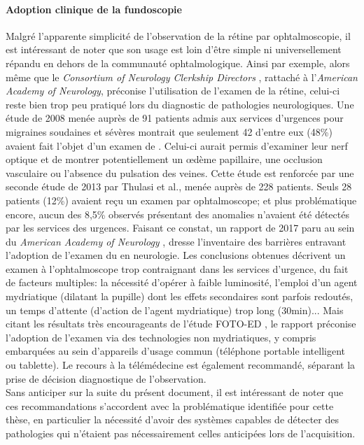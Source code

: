\paragraph{Adoption clinique de la fundoscopie}
Malgré l'apparente simplicité de l'observation de la rétine par ophtalmoscopie, il est intéressant de noter que son usage est loin d'être simple ni universellement répandu en dehors de la communauté ophtalmologique. Ainsi par exemple, alors même que le \textit{Consortium of Neurology Clerkship Directors} \cite{ConsortiumNeurologyClerkship}, rattaché à l'\textit{American Academy of Neurology}, préconise l'utilisation de l'examen de la rétine, celui-ci reste bien trop peu pratiqué lors du diagnostic de pathologies neurologiques. Une étude de 2008 menée auprès de 91 patients admis aux services d'urgences pour migraines soudaines et sévères montrait que seulement 42 d'entre eux (48\%) avaient fait l'objet d'un examen de \fundus{}. Celui-ci aurait permis d'examiner leur nerf optique et de montrer potentiellement un \oe{}dème papillaire, une occlusion vasculaire ou l'absence du pulsation des veines. Cette étude est renforcée par une seconde étude de 2013 par Thulasi et al.\cite{thulasiNonmydriaticOcularFundus2013}, menée auprès de 228 patients. Seuls 28 patients (12\%) avaient reçu un examen par ophtalmoscope; et plus problématique encore, aucun des 8,5\% \fundus{} observés présentant des anomalies n'avaient été détectés par les services des urgences.
Faisant ce constat, un rapport de 2017 paru au sein du \textit{American Academy of Neurology} \cite{Biousse167}, dresse l'inventaire des barrières entravant l'adoption de l'examen du \fundus{} en neurologie. Les conclusions obtenues décrivent un examen à l'ophtalmoscope trop contraignant dans les services d'urgence, du fait de facteurs multiples: la nécessité d'opérer à faible luminosité, l'emploi d'un agent mydriatique (dilatant la pupille) dont les effets secondaires sont parfois redoutés, un temps d'attente (d'action de l'agent mydriatique) trop long (30min)... Mais citant les résultats très encourageants de l'étude FOTO-ED \cite{breenEmergencyDepartmentEvaluation2008, bruceDiagnosticAccuracyUse2013, lamirelQualityNonmydriaticDigital2012, bruceFundusPhotographyVs2018}, le rapport préconise l'adoption de l'examen \fundus{} via des technologies non mydriatiques, y compris embarquées au sein d'appareils d'usage commun (téléphone portable intelligent  ou tablette). Le recours à la télémédecine est également recommandé, séparant la prise de décision diagnostique de l'observation. 
\\
Sans anticiper sur la suite du présent document, il est intéressant de noter que ces recommandations s'accordent avec la problématique identifiée pour cette thèse, en particulier la nécessité d'avoir des systèmes capables de détecter des pathologies qui n'étaient pas nécessairement celles anticipées lors de l'acquisition.
